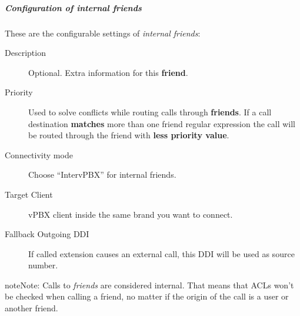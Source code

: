 \documentclass[letterpaper,10pt,english]{sphinxmanual}
\begin{document}
\subparagraph{Configuration of internal friends}
\label{administration_portal/client/vpbx/routing_endpoints/friends/internal_friends:configuration-of-internal-friends}
These are the configurable settings of \emph{internal friends}:
\begin{description}
\item[{Description}] \leavevmode{}\label{administration_portal/client/vpbx/routing_endpoints/friends/internal_friends:term-description}
Optional. Extra information for this \textbf{friend}.

\item[{Priority}] \leavevmode{}\label{administration_portal/client/vpbx/routing_endpoints/friends/internal_friends:term-priority}
Used to solve conflicts while routing calls through \textbf{friends}.
If a call destination \textbf{matches} more than one friend regular expression
the call will be routed through the friend with \textbf{less priority value}.

\item[{Connectivity mode}] \leavevmode{}\label{administration_portal/client/vpbx/routing_endpoints/friends/internal_friends:term-connectivity-mode}
Choose ``IntervPBX'' for internal friends.

\item[{Target Client}] \leavevmode{}\label{administration_portal/client/vpbx/routing_endpoints/friends/internal_friends:term-target-client}
vPBX client inside the same brand you want to connect.

\item[{Fallback Outgoing DDI}] \leavevmode{}\label{administration_portal/client/vpbx/routing_endpoints/friends/internal_friends:term-fallback-outgoing-ddi}
If called extension causes an external call, this DDI will be used as source number.

\end{description}

\begin{notice}{note}{Note:}
Calls to \emph{friends} are considered internal. That means that ACLs won't
be checked when calling a friend, no matter if the origin of the call
is a user or another friend.
\end{notice}
\end{document}
